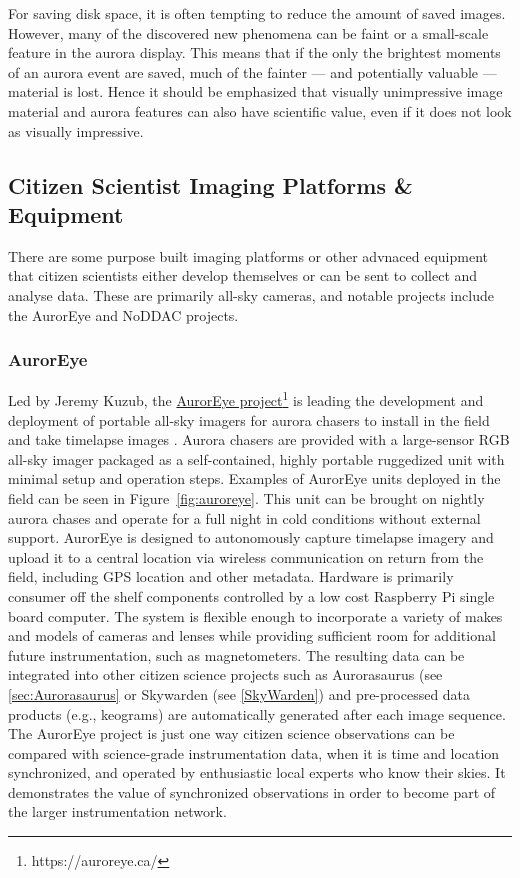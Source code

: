\documentclass{article}
\renewcommand{\cite}[1]{\parencite{#1}}
\begin{document}
For saving disk space, it is often tempting to reduce the amount of saved images. However, many of the discovered new phenomena can be faint or a small-scale feature in the aurora display. This means that if the only the brightest moments of an aurora event are saved, much of the fainter --- and potentially valuable --- material is lost. Hence it should be emphasized that visually unimpressive image material and aurora features can also have scientific value, even if it does not look as visually impressive.



\subsection{Citizen Scientist Imaging Platforms \& Equipment}
There are some purpose built imaging platforms or other advnaced equipment that citizen scientists either develop themselves or can be sent to collect and analyse data. These are primarily all-sky cameras, and notable projects include the AurorEye and NoDDAC projects.

\subsubsection{AurorEye}

Led by Jeremy Kuzub, the \href{https://auroreye.ca/}{AurorEye project}\footnote{https://auroreye.ca/} is leading the development and deployment of portable all-sky imagers for aurora chasers to install in the field and take timelapse images \cite{Kuzub2022}. Aurora chasers are provided with a large-sensor RGB all-sky imager packaged as a self-contained, highly portable ruggedized unit with minimal setup and operation steps. Examples of AurorEye units deployed in the field can be seen in Figure~\ref{fig:auroreye}. This unit can be brought on nightly aurora chases and operate for a full night in cold conditions without external support. AurorEye is designed to autonomously capture timelapse imagery and upload it to a central location via wireless communication on return from the field, including GPS location and other metadata. Hardware is primarily consumer off the shelf components controlled by a low cost Raspberry Pi single board computer. The system is flexible enough to incorporate a variety of makes and models of cameras and lenses while providing sufficient room for additional future instrumentation, such as magnetometers. The resulting data can be integrated into other citizen science projects such as Aurorasaurus (see \ref{sec:Aurorasaurus} or Skywarden (see \ref{SkyWarden}) and pre-processed data products (e.g., keograms) are automatically generated after each image sequence. The AurorEye project is just one way citizen science observations can be compared with science-grade instrumentation data, when it is time and location synchronized, and operated by enthusiastic local experts who know their skies. It demonstrates the value of synchronized observations in order to become part of the larger instrumentation network. 
\end{document}
